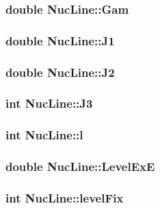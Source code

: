 \subsubsection{\setlength{\rightskip}{0pt plus 5cm}double \bf{Nuc\-Line::Gam}}\label{structNucLine_e01f4d6d01e1bb486aff2c93ff0c6cb0}


\subsubsection{\setlength{\rightskip}{0pt plus 5cm}double \bf{Nuc\-Line::J1}}\label{structNucLine_5f8ccdff2d11effd4c0388320f0afafe}


\subsubsection{\setlength{\rightskip}{0pt plus 5cm}double \bf{Nuc\-Line::J2}}\label{structNucLine_1cf84fb006c01388b77bc15173bad55a}


\subsubsection{\setlength{\rightskip}{0pt plus 5cm}int \bf{Nuc\-Line::J3}}\label{structNucLine_b0676e8dd3ce5b5176c846839af75a97}


\subsubsection{\setlength{\rightskip}{0pt plus 5cm}int \bf{Nuc\-Line::l}}\label{structNucLine_b60cedfde6935cc951d26f74f769027f}


\subsubsection{\setlength{\rightskip}{0pt plus 5cm}double \bf{Nuc\-Line::Level\-Ex\-E}}\label{structNucLine_41bbeb5e7cbc146ded47889fde6ec20e}


\subsubsection{\setlength{\rightskip}{0pt plus 5cm}int \bf{Nuc\-Line::level\-Fix}}\label{structNucLine_f86efa2eb0d55554c9ee83acd00c98ad}


